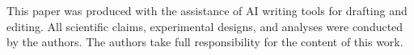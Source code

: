 This paper was produced with the assistance of AI writing tools for drafting and editing.
All scientific claims, experimental designs, and analyses were conducted by the authors.
The authors take full responsibility for the content of this work.
